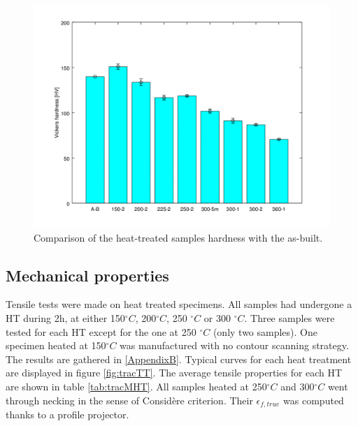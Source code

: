 \begin{figure}[ht]
	\centering
	\centerline{\includegraphics[scale=0.6]{Images/hardness.png}}
	\decoRule
	\caption[Comparison of the heat-treated samples hardness with the as-built.]{Comparison of the heat-treated samples hardness with the as-built.}
	\label{fig:hardness}
\end{figure}


\subsection{Mechanical properties}

Tensile tests were made on heat treated specimens. All samples had undergone a HT during 2h, at either 150$^\circ C$, 200$^\circ C$, 250 $^\circ C$ or 300 $^\circ C$. Three samples were tested for each HT except for the one at 250 $^\circ C$ (only two samples). One specimen heated at 150$^\circ C$ was manufactured with no contour scanning strategy. The results are gathered in \ref{AppendixB}. Typical curves for each heat treatment are displayed in figure \ref{fig:tracTT}. The average tensile properties for each HT are shown in table \ref{tab:tracMHT}. All samples heated at 250$^\circ C$ and 300$^\circ C$ went through necking in the sense of Considère criterion. Their $\epsilon_{f,true}$ was computed thanks to a profile projector. \\

